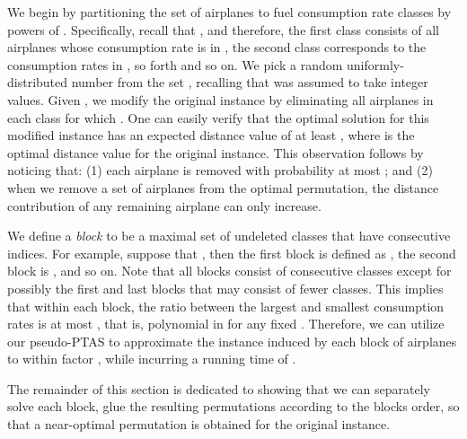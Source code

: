 \documentclass[11pt]{article}
\theoremstyle{plain}
\theoremstyle{definition}
\begin{document}
 We begin by partitioning the set of airplanes to fuel consumption rate classes   by powers of . Specifically, recall that , and therefore, the first class consists of all airplanes whose consumption rate is in , the second class corresponds to the consumption rates in , so forth and so on. We pick a random uniformly-distributed number  from the set , recalling that  was assumed to take integer values. Given , we modify the original instance by eliminating all airplanes in each class  for which . One can easily verify that the optimal solution for this modified instance has an expected distance value of at least , where  is the optimal distance value for the original instance. This observation follows by noticing that: (1) each airplane is removed with probability at most ; and (2) when we remove a set of airplanes from the optimal permutation, the distance contribution of any remaining airplane can only increase.

We define a \textit{block} to be a maximal set of undeleted classes that have consecutive indices. For example, suppose that , then the first block is defined as , the second block is , and so on. Note that all blocks consist of  consecutive classes except for possibly the first and last blocks that may consist of  fewer classes. This implies that within each block, the ratio between the largest and smallest consumption rates is at most , that is, polynomial in  for any fixed . Therefore, we can utilize our pseudo-PTAS to approximate the instance induced by each block of airplanes to within factor , while incurring a running time of .

\smallskip {} The remainder of this section is dedicated to showing that we can separately solve each block, glue the resulting permutations according to the blocks order, so that a near-optimal permutation is obtained for the original instance.
\end{document}
